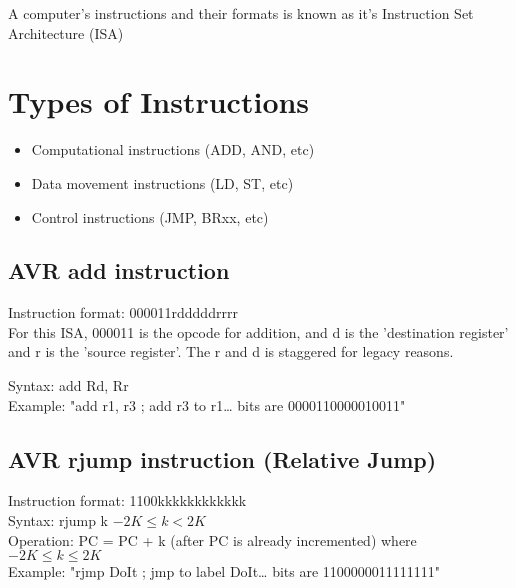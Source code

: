 \documentclass{article}
\begin{document}
A computer's instructions and their formats is known as it's Instruction Set Architecture (ISA)

\section{Types of Instructions}
\begin{itemize}
  \item Computational instructions (ADD, AND, etc)
  \item Data movement instructions (LD, ST, etc)
  \item Control instructions (JMP, BRxx, etc)
\end{itemize}

\subsection{AVR add instruction}
Instruction format: 000011rdddddrrrr\\
For this ISA, 000011 is the opcode for addition, and d is the 'destination register' and r is the 'source register'. The r and d is staggered for legacy reasons.

Syntax: add Rd, Rr\\
Example: "add r1, r3 ; add r3 to r1… bits are 0000110000010011"\\

\subsection{AVR rjump instruction (Relative Jump)}
Instruction format: 1100kkkkkkkkkkkk\\

Syntax: rjump k $-2K \leq k < 2K$\\
Operation: PC = PC + k (after PC is already incremented) where $-2K \leq k \leq 2K$\\
Example: "rjmp DoIt ; jmp to label DoIt… bits are 1100000011111111"\\
\end{document}

